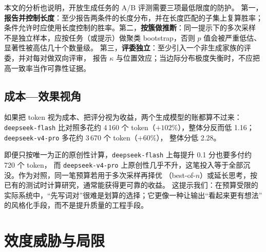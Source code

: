 \documentclass[UTF8,11pt,a4paper]{ctexart}
\newcommand{\deepflash}{\texttt{deepseek-flash}}
\newcommand{\deeppro}{\texttt{deepseek-v4-pro}}
\begin{document}
本文的分析也说明，开放生成任务的 A/B 评测需要三项最低限度的防护。
第一，\textbf{报告并控制长度}：至少报告两条件的长度分布，并在长度匹配的子集上复算胜率；
条件允许时应使用长度控制的胜率\cite{dubois2024lc}。第二，\textbf{按簇做推断}：同一提示下的多次采样
不是独立样本，应按任务（或提示）做聚类 bootstrap，否则 $p$ 值会被严重低估、显著性被高估几十个数量级。
第三，\textbf{评委独立}：至少引入一个非生成家族的评委，并对每对做双向评审，
报告 $\kappa$ 与位置效应；当边际分布极度失衡时，不应把高一致率当作可靠性证据。

\subsection{成本—效果视角}

\begin{sloppypar}
如果把 token 视为成本、把评分视为收益，两个生成模型的账都算不过来：\deepflash{} 比对照多花约
 4\,160 个 token（$+102\%$），整体分反而低 1.16；\deeppro{} 多花约 3\,670 个 token（$+60\%$），
 整体分低 2.28。
\end{sloppypar}

即便只按唯一为正的原创性计算，\deepflash{} 上每提升 0.1 分也要多付约 720 个 token，
而 \deeppro{} 上原创性几乎不升，这笔投入等于全部沉没。作为对照，同一笔预算若用于多次采样再择优
（best-of-$n$）或延长思考，按已有的测试时计算研究\cite{snell2025}，通常能获得更可靠的收益。
这提示我们：在预算受限的实际系统中，“先写词对”很难是划算的选择；它更像一种让输出“看起来更有想法”
的风格化手段，而不是提升质量的工程手段。

\section{效度威胁与局限}
\end{document}
